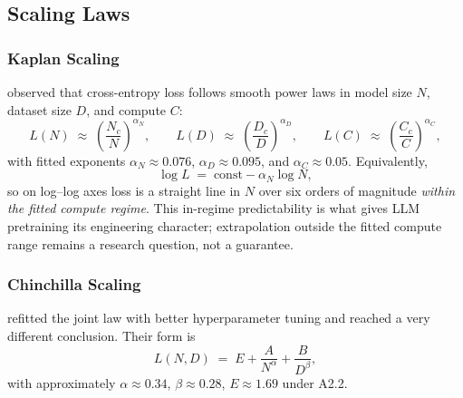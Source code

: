 \subsection{Scaling Laws}

\subsubsection{Kaplan Scaling}

\citet{kaplan2020scaling} observed that cross-entropy loss follows
smooth power laws in model size $N$, dataset size $D$, and compute $C$:
\begin{equation}
\label{eq:week2-kaplan}
L(N) \;\approx\; \left(\frac{N_c}{N}\right)^{\alpha_N},
\qquad
L(D) \;\approx\; \left(\frac{D_c}{D}\right)^{\alpha_D},
\qquad
L(C) \;\approx\; \left(\frac{C_c}{C}\right)^{\alpha_C},
\end{equation}
with fitted exponents $\alpha_N \approx 0.076$,
$\alpha_D \approx 0.095$, and $\alpha_C \approx 0.05$. Equivalently,
\[
\log L \;=\; \mathrm{const} - \alpha_N \log N,
\]
so on log--log axes loss is a straight line in $N$ over six orders of
magnitude \emph{within the fitted compute regime}. This in-regime
predictability is what gives LLM pretraining its engineering
character; extrapolation outside the fitted compute range remains
a research question, not a guarantee.

\subsubsection{Chinchilla Scaling}

\citet{hoffmann2022chinchilla} refitted the joint law with better
hyperparameter tuning and reached a very different conclusion. Their
form is
\begin{equation}
\label{eq:week2-chinchilla}
L(N, D) \;=\; E + \frac{A}{N^{\alpha}} + \frac{B}{D^{\beta}},
\end{equation}
with approximately $\alpha \approx 0.34$, $\beta \approx 0.28$,
$E \approx 1.69$ under A2.2.

